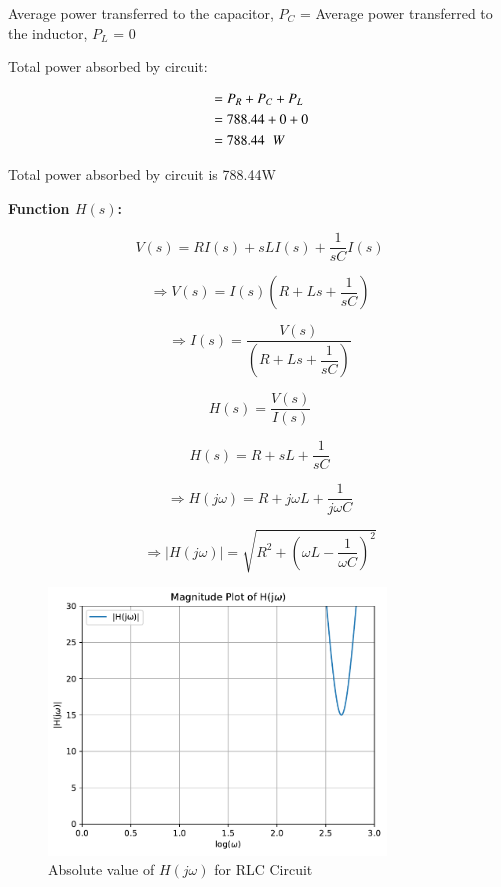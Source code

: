 \documentclass[journal,12pt,twocolumn]{IEEEtran}
\theoremstyle{remark}
\begin{document}
Average power transferred to the capacitor, $P_C$ = Average power transferred to the inductor, $P_L$ = 0

Total power absorbed by circuit:

\begin{align}
	&= P_R + P_C + P_L
	\\&= 788.44 + 0 + 0
	\\&= 788.44\hspace{0.2cm}W
\end{align}

Total power absorbed by circuit is 788.44\hspace{0.01cm}W

\vspace{1cm}

\textbf{Function \(H(s)\):}


\begin{equation}
	V(s) = R I(s) + sL I(s) + \dfrac{1}{sC} I(s)
\end{equation}


\begin{equation}
	\Rightarrow V(s) = I(s)\left(R + Ls + \dfrac{1}{sC}\right)
\end{equation}

\begin{equation}
	\Rightarrow I(s) = \dfrac{V(s)}{\left(R + Ls + \dfrac{1}{sC}\right)} \label{eq: 4}
\end{equation}

\begin{equation}
	H(s) = \dfrac{V(s)}{I(s)}
\end{equation}

\begin{equation}
	H(s) = R + sL + \dfrac{1}{sC}
\end{equation}

\begin{equation}
	\Rightarrow H(j\omega) = R + j\omega L + \dfrac{1}{j\omega C}
\end{equation}

\begin{equation}
	\Rightarrow \lvert H(j\omega) \rvert = \sqrt{R^2 + \left(\omega L - \dfrac{1}{\omega C}\right)^2}
\end{equation}


\begin{figure}
	\centering
	\includegraphics[width=0.8\textwidth]{figs/magnitude_plot.pdf}
	\caption{Absolute value of $H(j\omega)$ for RLC Circuit}
	\label{fig:magnitude_plot}
\end{figure}

 
\end{document}
